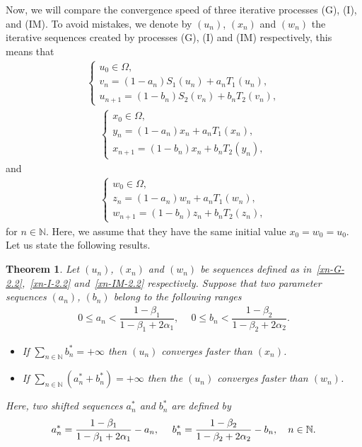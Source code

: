 \documentclass[a4paper, 11pt]{article}
\newtheorem{theorem}{Theorem}[section]
\begin{document}
Now, we will compare the convergence speed of three iterative processes (G), (I), and (IM). To avoid mistakes, we denote by $(u_n)$, $(x_n)$ and $(w_n)$ the iterative sequences created by processes (G), (I) and (IM) respectively, this means that 
\begin{align}\label{xn-G-2.2}
\begin{cases}
	u_0 \in \Omega, \\
	v_n=(1-a_n)S_1(u_n)+a_nT_1(u_n),\\
	u_{n+1}=(1-b_n)S_2(v_n)+b_nT_2(v_n), \end{cases}
\end{align}
\begin{align}\label{xn-I-2.2}
\begin{cases}
	x_0 \in \Omega, \\
	y_n=(1-a_n)x_n+a_nT_1(x_n),\\
	x_{n+1}=(1-b_n)x_n+b_nT_2(y_n), \end{cases}
\end{align}
and
\begin{align}\label{xn-IM-2.2}
\begin{cases}
	w_0 \in \Omega, \\
	z_n=(1-a_n)w_n+a_nT_1(w_n),\\
	w_{n+1}=(1-b_n)z_n+b_nT_2(z_n), \end{cases}
\end{align}
for $n \in \mathbb{N}$. Here, we assume that they have the same initial value $x_0 = w_0 = u_0$.  Let us state the following results.
\begin{theorem}
Let $(u_n)$, $(x_n)$ and $(w_n)$ be sequences defined as in~\eqref{xn-G-2.2},~\eqref{xn-I-2.2} and~\eqref{xn-IM-2.2}  respectively. Suppose that two parameter sequences $(a_n)$, $(b_n)$ belong to the following ranges
\begin{align}\label{cond-2.2}
0 \le a_n < \dfrac{1 - \beta_1}{1 - \beta_1 + 2\alpha_1}, \quad \  0 \le b_n < \dfrac{1 - \beta_2}{1 - \beta_2 + 2\alpha_2}.
\end{align}
\begin{itemize}
\item[i)] If $\displaystyle\sum_{n \in \mathbb{N}} b^*_n = +\infty$ then $(u_n)$ converges faster than $(x_n)$. 
\item[ii)] If $\displaystyle\sum_{n \in \mathbb{N}} (a^*_n + b^*_n) = +\infty$ then the  $(u_n)$ converges faster than $(w_n)$. 
\end{itemize}
Here, two shifted sequences $a^*_n$ and $b_n^*$ are defined by
\begin{align}\notag %
a^*_n = \dfrac{1 - \beta_1}{1 - \beta_1 + 2\alpha_1} - a_n, \quad \ b^*_n = \dfrac{1 - \beta_2}{1 - \beta_2 + 2\alpha_2} - b_n, \quad n \in \mathbb{N}.
\end{align}
\end{theorem}
\end{document}
